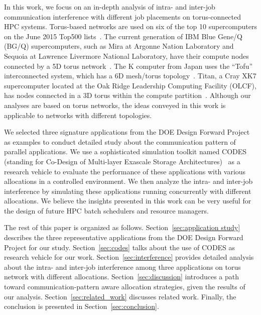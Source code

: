 In this work, we focus on an in-depth analysis of intra- and inter-job 
communication interference with different job placements on torus-connected HPC systems. 
Torus-based networks are used on six of the top 10 supercomputers 
on the June 2015 Top500 lists~\cite{top500}. 
The current generation of IBM Blue Gene/Q (BG/Q) supercomputers, 
such as Mira at Argonne Nation Laboratory and 
Sequoia at Lawrence Livermore National Laboratory, 
have their compute nodes connected by a 5D torus network~\cite{bgq}. 
The K computer from Japan uses the ``Tofu'' interconnected system, 
which has a 6D mesh/torus topology~\cite{tofu}. 
Titan, a Cray XK7 supercomputer located at the Oak Ridge Leadership Computing Facility (OLCF), 
has nodes connected in a 3D torus within the compute partition~\cite{titan}. 
Although our analyses are based on torus networks, 
the ideas conveyed in this work is applicable to networks with different topologies. 

We selected three signature applications from 
the DOE Design Forward Project~\cite{designforwardwebpage} as examples 
to conduct detailed study about the communication pattern of parallel applications. 
We use a sophisticated simulation toolkit named CODES 
(standing for Co-Design of Multi-layer Exascale Storage Architectures)~\cite{Jason-2011} 
as a research vehicle to evaluate the performance of these applications 
with various allocations in a controlled environment. 
We then analyze the intra- and inter-job interference 
by simulating these applications running concurrently with different allocations. 
We believe the insights presented in this work can be very useful 
for the design of future HPC batch schedulers and resource managers.


The rest of this paper is organized as follows. 
Section~\ref{sec:application study} describes the three representative applications 
from the DOE Design Forward Project for our study. 
Section~\ref{sec:codes} talks about the use of CODES as research vehicle for our work. 
Section~\ref{sec:interference} provides detailed analysis about the intra- and inter-job interference 
among three applications on torus network with different allocations. 
Section~\ref{sec:discussion} introduces a path toward communication-pattern aware allocation strategies, 
given the results of our analysis. 
Section~\ref{sec:related_work} discusses related work. 
Finally, the conclusion is presented in Section~\ref{sec:conclusion}.




